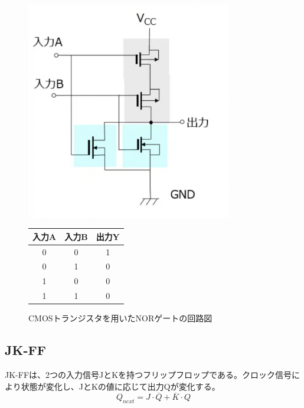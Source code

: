 \documentclass{jlreq}
\numberwithin{equation}{section}
\begin{document}
\begin{figure}[H]
  \centering
  \begin{minipage}{0.45\textwidth}
    \centering
    \includegraphics[width=0.8\textwidth]{assets/nor.png}
    \caption{CMOSトランジスタを用いたNORゲートの回路図}
    \label{fig:nor_gate}
  \end{minipage}
  \hfill
  \begin{minipage}{0.45\textwidth}
    \centering
    \label{tab:nor_truth_table}
    \begin{tabular}{|c|c|c|}
      \hline
      入力A & 入力B & 出力Y \\ \hline
      0     & 0     & 1     \\ \hline
      0     & 1     & 0     \\ \hline
      1     & 0     & 0     \\ \hline
      1     & 1     & 0     \\ \hline
    \end{tabular}
  \end{minipage}
\end{figure}

\subsection{JK-FF}
JK-FFは、2つの入力信号JとKを持つフリップフロップである。クロック信号により状態が変化し、JとKの値に応じて出力Qが変化する。
\begin{equation}
  Q_{next} = J \cdot \overline{Q} + \overline{K} \cdot Q
\end{equation}
\end{document}
